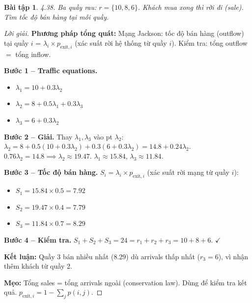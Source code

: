 \documentclass[8pt,a4paper]{article}
\newtheorem{exercise}{Bài tập}
\newenvironment{solution}{\begin{proof}[Lời giải]}{\end{proof}}
\begin{document}
\begin{exercise}
4.38. Ba quầy rau: $r=\{10, 8, 6\}$. Khách mua xong thì rời đi (sale). Tìm tốc độ bán hàng tại mỗi quầy.
\end{exercise}
\begin{solution}
\textbf{Phương pháp tổng quát:} Mạng Jackson: tốc độ bán hàng (outflow) tại quầy $i$ = $\lambda_i \times p_{\text{exit},i}$ (xác suất rời hệ thống từ quầy $i$). Kiểm tra: tổng outflow $=$ tổng inflow.

\textbf{Bước 1 -- Traffic equations.}
\begin{itemize}[nosep]
\item $\lambda_1 = 10 + 0.3\lambda_2$
\item $\lambda_2 = 8 + 0.5\lambda_1 + 0.3\lambda_3$
\item $\lambda_3 = 6 + 0.3\lambda_2$
\end{itemize}

\textbf{Bước 2 -- Giải.} Thay $\lambda_1, \lambda_3$ vào pt $\lambda_2$:
$\lambda_2 = 8 + 0.5(10 + 0.3\lambda_2) + 0.3(6 + 0.3\lambda_2) = 14.8 + 0.24\lambda_2$.
$0.76\lambda_2 = 14.8 \implies \lambda_2 \approx 19.47$.
$\lambda_1 \approx 15.84$, $\lambda_3 \approx 11.84$.

\textbf{Bước 3 -- Tốc độ bán hàng.} $S_i = \lambda_i \times p_{\text{exit},i}$ (xác suất rời mạng từ quầy $i$):
\begin{itemize}[nosep]
\item $S_1 = 15.84 \times 0.5 = 7.92$
\item $S_2 = 19.47 \times 0.4 = 7.79$
\item $S_3 = 11.84 \times 0.7 = 8.29$
\end{itemize}

\textbf{Bước 4 -- Kiểm tra.} $S_1 + S_2 + S_3 = 24 = r_1 + r_2 + r_3 = 10 + 8 + 6$. $\checkmark$

\textbf{Kết luận:} Quầy 3 bán nhiều nhất ($8.29$) dù arrivals thấp nhất ($r_3 = 6$), vì nhận thêm khách từ quầy 2.

\textbf{Mẹo:} Tổng sales = tổng arrivals ngoài (conservation law). Dùng để kiểm tra kết quả. $p_{\text{exit},i} = 1 - \sum_j p(i,j)$.
\end{solution}
\end{document}
